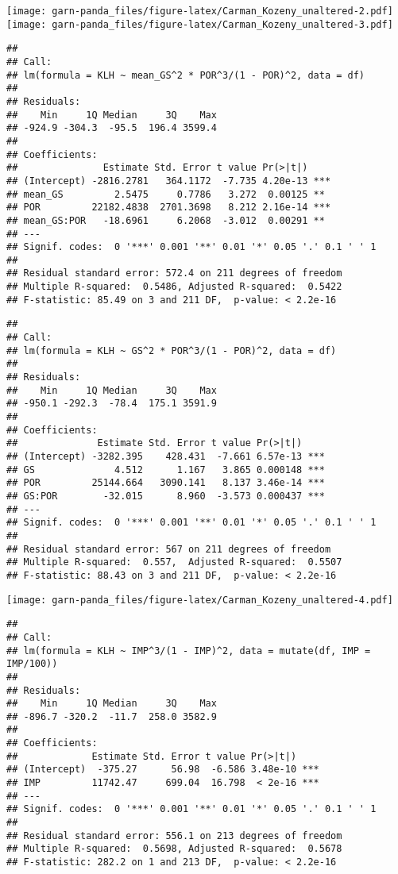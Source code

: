 \documentclass[]{article}
\begin{document}
\texttt{[image: garn-panda\_files/figure-latex/Carman\_Kozeny\_unaltered-2.pdf]}
\texttt{[image: garn-panda\_files/figure-latex/Carman\_Kozeny\_unaltered-3.pdf]}

\begin{verbatim}
## 
## Call:
## lm(formula = KLH ~ mean_GS^2 * POR^3/(1 - POR)^2, data = df)
## 
## Residuals:
##    Min     1Q Median     3Q    Max 
## -924.9 -304.3  -95.5  196.4 3599.4 
## 
## Coefficients:
##               Estimate Std. Error t value Pr(>|t|)    
## (Intercept) -2816.2781   364.1172  -7.735 4.20e-13 ***
## mean_GS         2.5475     0.7786   3.272  0.00125 ** 
## POR         22182.4838  2701.3698   8.212 2.16e-14 ***
## mean_GS:POR   -18.6961     6.2068  -3.012  0.00291 ** 
## ---
## Signif. codes:  0 '***' 0.001 '**' 0.01 '*' 0.05 '.' 0.1 ' ' 1
## 
## Residual standard error: 572.4 on 211 degrees of freedom
## Multiple R-squared:  0.5486, Adjusted R-squared:  0.5422 
## F-statistic: 85.49 on 3 and 211 DF,  p-value: < 2.2e-16
\end{verbatim}

\begin{verbatim}
## 
## Call:
## lm(formula = KLH ~ GS^2 * POR^3/(1 - POR)^2, data = df)
## 
## Residuals:
##    Min     1Q Median     3Q    Max 
## -950.1 -292.3  -78.4  175.1 3591.9 
## 
## Coefficients:
##              Estimate Std. Error t value Pr(>|t|)    
## (Intercept) -3282.395    428.431  -7.661 6.57e-13 ***
## GS              4.512      1.167   3.865 0.000148 ***
## POR         25144.664   3090.141   8.137 3.46e-14 ***
## GS:POR        -32.015      8.960  -3.573 0.000437 ***
## ---
## Signif. codes:  0 '***' 0.001 '**' 0.01 '*' 0.05 '.' 0.1 ' ' 1
## 
## Residual standard error: 567 on 211 degrees of freedom
## Multiple R-squared:  0.557,  Adjusted R-squared:  0.5507 
## F-statistic: 88.43 on 3 and 211 DF,  p-value: < 2.2e-16
\end{verbatim}

\texttt{[image: garn-panda\_files/figure-latex/Carman\_Kozeny\_unaltered-4.pdf]}

\begin{verbatim}
## 
## Call:
## lm(formula = KLH ~ IMP^3/(1 - IMP)^2, data = mutate(df, IMP = IMP/100))
## 
## Residuals:
##    Min     1Q Median     3Q    Max 
## -896.7 -320.2  -11.7  258.0 3582.9 
## 
## Coefficients:
##             Estimate Std. Error t value Pr(>|t|)    
## (Intercept)  -375.27      56.98  -6.586 3.48e-10 ***
## IMP         11742.47     699.04  16.798  < 2e-16 ***
## ---
## Signif. codes:  0 '***' 0.001 '**' 0.01 '*' 0.05 '.' 0.1 ' ' 1
## 
## Residual standard error: 556.1 on 213 degrees of freedom
## Multiple R-squared:  0.5698, Adjusted R-squared:  0.5678 
## F-statistic: 282.2 on 1 and 213 DF,  p-value: < 2.2e-16
\end{verbatim}
\end{document}
